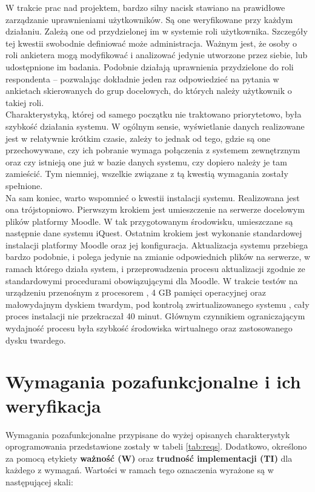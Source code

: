 W trakcie prac nad projektem, bardzo silny nacisk stawiano na prawidłowe zarządzanie uprawnieniami użytkowników. Są one weryfikowane przy każdym działaniu. Zależą one od przydzielonej im w systemie roli użytkownika. Szczegóły tej kwestii swobodnie definiować może administracja. Ważnym jest, że osoby o roli ankietera mogą modyfikować i analizować jedynie utworzone przez siebie, lub udostępnione im badania. Podobnie działają uprawnienia przydzielone do roli respondenta -- pozwalając dokładnie jeden raz odpowiedzieć na pytania w ankietach skierowanych do grup docelowych, do których należy użytkownik o takiej roli. \\

Charakterystyką, której od samego początku nie traktowano priorytetowo, była szybkość działania systemu. W ogólnym sensie, wyświetlanie danych realizowane jest w relatywnie krótkim czasie, zależy to jednak od tego, gdzie są one przechowywane, czy ich pobranie wymaga połączenia z systemem zewnętrznym oraz czy istnieją one już w bazie danych systemu, czy dopiero należy je tam zamieścić. Tym niemniej, wszelkie związane z tą kwestią wymagania zostały spełnione. \\

Na sam koniec, warto wspomnieć o kwestii instalacji systemu. Realizowana jest ona trójstopniowo. Pierwszym krokiem jest umieszczenie na serwerze docelowym plików platformy Moodle. W tak przygotowanym środowisku, umieszczane są następnie dane systemu iQuest. Ostatnim krokiem jest wykonanie standardowej instalacji platformy Moodle oraz jej konfiguracja. Aktualizacja systemu przebiega bardzo podobnie, i polega jedynie na zmianie odpowiednich plików na serwerze, w ramach którego działa system, i przeprowadzenia procesu aktualizacji zgodnie ze standardowymi procedurami obowiązującymi dla Moodle. W trakcie testów na urządzeniu przenośnym z procesorem , 4 GB pamięci operacyjnej oraz małowydajnym dyskiem twardym, pod kontrolą zwirtualizowanego systemu , cały proces instalacji nie przekraczał 40 minut. Głównym czynnikiem ograniczającym wydajność procesu była szybkość środowiska wirtualnego oraz zastosowanego dysku twardego.

\section{Wymagania pozafunkcjonalne i ich weryfikacja}
\label{Chapter43}

Wymagania pozafunkcjonalne przypisane do wyżej opisanych charakterystyk oprogramowania przedstawione zostały w tabeli \ref{tab:reqs}. Dodatkowo, określono za pomocą etykiety \textbf{ważność (W)} oraz \textbf{trudność implementacji (TI)} dla każdego z wymagań. Wartości w ramach tego oznaczenia wyrażone są w następującej skali:

